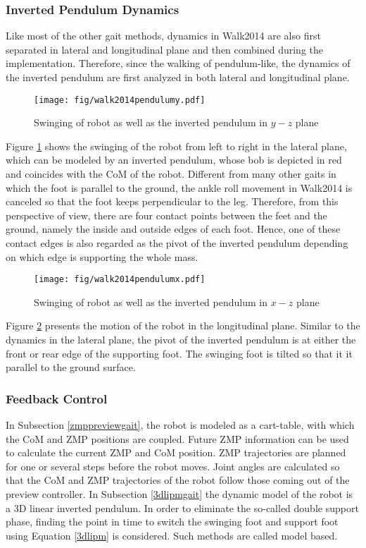 \subsubsection{Inverted Pendulum Dynamics}
Like most of the other gait methods, dynamics in Walk2014 are also first separated in lateral and longitudinal plane and then combined during the implementation. Therefore, since the walking of pendulum-like, the dynamics of the inverted pendulum are first analyzed in both lateral and longitudinal plane.

\begin{figure}[H]
	\centering
	\texttt{[image: fig/walk2014pendulumy.pdf]}
	\caption{Swinging of robot as well as the inverted pendulum in $ y-z $ plane}
	\label{walk2014lateral}
\end{figure}
Figure {\ref{walk2014lateral}} shows the swinging of the robot from left to right in the lateral plane, which can be modeled by an inverted pendulum, whose bob is depicted in red and coincides with the CoM of the robot. Different from many other gaits in which the foot is parallel to the ground, the ankle roll movement in Walk2014 is canceled so that the foot keeps perpendicular to the leg. Therefore, from this perspective of view, there are four contact points between the feet and the ground, namely the inside and outside edges of each foot. Hence, one of these contact edges is also regarded as the pivot of the inverted pendulum depending on which edge is supporting the whole mass.

\begin{figure}[H]
	\centering
	\texttt{[image: fig/walk2014pendulumx.pdf]}
	\caption{Swinging of robot as well as the inverted pendulum in $ x-z $ plane}
	\label{walk2014longitudinal}
\end{figure}
Figure {\ref{walk2014longitudinal}} presents the motion of the robot in the longitudinal plane. Similar to the dynamics in the lateral plane, the pivot of the inverted pendulum is at either the front or rear edge of the supporting foot. The swinging foot is tilted so that it it parallel to the ground surface.

\subsubsection{Feedback Control}
In Subsection {\ref{zmppreviewgait}}, the robot is modeled as a cart-table, with which the CoM and ZMP positions are coupled. Future ZMP information can be used to calculate the current ZMP and CoM position. ZMP trajectories are planned for one or several steps before the robot moves. Joint angles are calculated so that the CoM and ZMP trajectories of the robot follow those coming out of the preview controller.  In Subsection {\ref{3dlipmgait}} the dynamic model of the robot is a 3D linear inverted pendulum. In order to eliminate the so-called double support phase, finding the point in time to switch the swinging foot and support foot using Equation {\ref{3dlipm}} is considered. Such methods are called model based.

